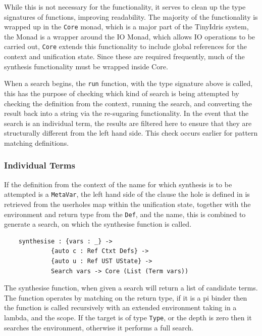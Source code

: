 \documentclass[a4paper]{article}
\begin{document}
While this is not necessary for the functionality, it serves
to clean up the type signatures of functions, improving readability. 
The majority of the functionality is wrapped up in the \texttt{Core}
monad, which is a major part of the TinyIdris system, the Monad
is a wrapper around the IO Monad, which allows IO operations to be
carried out, \texttt{Core} extends this functionality to include
global references for the context and unification state. Since these
are required frequently, much of the synthesis functionality must be wrapped inside
Core. 

When a search begins, the \texttt{run} function, with the type signature above is called, this
has the purpose of checking which kind of search is being attempted by
checking the definition from the context, running the search, and
converting the result back into a string via the re-sugaring
functionality. In the event that the search is an individual term,
the results are filtered here to ensure that they are structurally
different from the left hand side. This check occurs earlier for pattern matching definitions.

\subsubsection{Individual Terms}
If the definition from the context of the name for which synthesis is to be attempted is a \texttt{MetaVar},
the left hand side of the clause the hole is defined in is retrieved from
the userholes map within the unification state, together with the
environment and return type from the \texttt{Def}, and the name,
this is combined to generate a search, on which the synthesise function
is called.

\begin{center}
  \begin{verbatim}
    synthesise : {vars : _} -> 
             {auto c : Ref Ctxt Defs} -> 
             {auto u : Ref UST UState} ->
             Search vars -> Core (List (Term vars))
  \end{verbatim}
\end{center}

The synthesise function, when given a search will return a list of
candidate terms. The function operates by matching on the return
type, if it is a pi binder then the function is called recursively
with an extended environment taking in a lambda, and the scope. If the
target is of type \texttt{Type}, or the depth is zero then it searches the environment,
otherwise it performs a full search.
\end{document}
